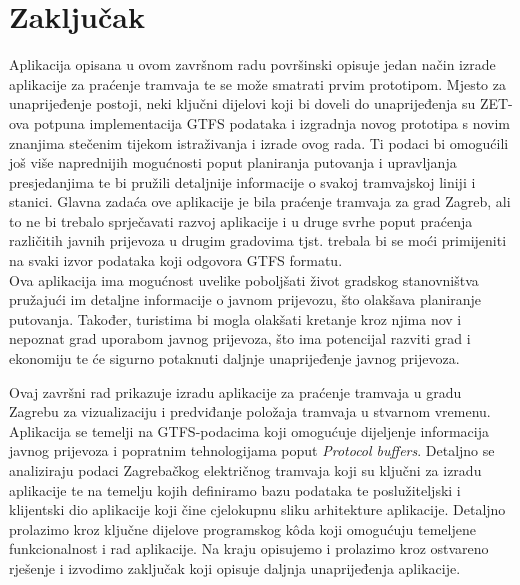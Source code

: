 \documentclass[zavrsnirad]{fer}
\begin{document}
\chapter{Zaključak}
\label{pog:zakljucak}
Aplikacija opisana u ovom završnom radu površinski opisuje jedan način izrade aplikacije za praćenje tramvaja te se može smatrati prvim prototipom. Mjesto za unaprijeđenje postoji, neki ključni dijelovi koji bi doveli do unaprijeđenja su ZET-ova potpuna implementacija GTFS podataka i izgradnja novog prototipa s novim znanjima stečenim tijekom istraživanja i izrade ovog rada. Ti podaci bi omogućili još više naprednijih mogućnosti poput planiranja putovanja i upravljanja presjedanjima te bi pružili detaljnije informacije o svakoj tramvajskoj liniji i stanici. Glavna zadaća ove aplikacije je bila praćenje tramvaja za grad Zagreb, ali to ne bi trebalo sprječavati razvoj aplikacije i u druge svrhe poput praćenja različitih javnih prijevoza u drugim gradovima tjst. trebala bi se moći primijeniti na svaki izvor podataka koji odgovora GTFS formatu.\\
Ova aplikacija ima mogućnost uvelike poboljšati život gradskog stanovništva pružajući im detaljne informacije o javnom prijevozu, što olakšava planiranje putovanja. Također, turistima bi mogla olakšati kretanje kroz njima nov i nepoznat grad uporabom javnog prijevoza, što ima potencijal razviti grad i ekonomiju te će sigurno potaknuti daljnje unaprijeđenje javnog prijevoza.



\nocite{*}




\begin{sazetak}
	Ovaj završni rad prikazuje izradu aplikacije za praćenje tramvaja u gradu Zagrebu za vizualizaciju i predviđanje položaja tramvaja u stvarnom vremenu. Aplikacija se temelji na GTFS-podacima koji omogućuje dijeljenje informacija javnog prijevoza i popratnim tehnologijama poput \textit{Protocol buffers}. Detaljno se analiziraju podaci Zagrebačkog električnog tramvaja koji su ključni za izradu aplikacije te na temelju kojih definiramo bazu podataka te poslužiteljski i klijentski dio aplikacije koji čine cjelokupnu sliku arhitekture aplikacije. Detaljno prolazimo kroz ključne dijelove programskog k\^oda koji omogućuju temeljene funkcionalnost i rad aplikacije.
	Na kraju opisujemo i prolazimo kroz ostvareno rješenje i izvodimo zaključak koji opisuje daljnja unaprijeđenja aplikacije.
\end{sazetak}
\end{document}
